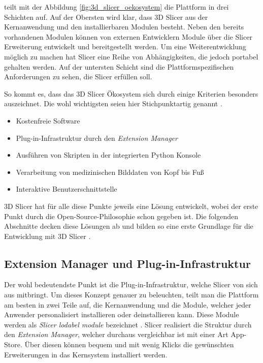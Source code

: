 \citet[S.~23]{fedorov2012slicer} teilt mit der Abbildung \ref{fig:3d_slicer_oekosystem}
die Plattform in drei Schichten auf. Auf der Obersten wird klar, dass 3D Slicer aus
der Kernanwendung und den installierbaren Modulen besteht. Neben den bereits
vorhandenen Modulen können von externen Entwicklern Module über die Slicer
Erweiterung entwickelt und bereitgestellt werden. Um eine Weiterentwicklung möglich
zu machen hat Slicer eine Reihe von Abhängigkeiten, die jedoch portabel gehalten
werden. Auf der untersten Schicht sind die Plattformspezifischen Anforderungen zu
sehen, die Slicer erfüllen soll.

So kommt es, dass das 3D Slicer Ökosystem sich durch einige Kriterien besonders auszeichnet.
Die wohl wichtigsten seien hier Stichpunktartig genannt \citep[vgl.][S.~11]{fedorov2012slicer}.

\begin{itemize}
	\item Kostenfreie Software

	\item Plug-in-Infrastruktur durch den \textit{Extension Manager}

	\item Ausführen von Skripten in der integrierten Python Konsole

	\item Verarbeitung von medizinischen Bilddaten von Kopf bis Fuß

	\item Interaktive Benutzerschnittstelle
\end{itemize}

3D Slicer hat für alle diese Punkte jeweils eine Lösung entwickelt, wobei der erste
Punkt durch die Open-Source-Philosophie schon gegeben ist. Die folgenden
Abschnitte decken diese Lösungen ab und bilden so eine erste Grundlage für die
Entwicklung mit 3D Slicer \citep[vgl.][S.~11]{fedorov2012slicer}.

\subsection{Extension Manager und Plug-in-Infrastruktur}
Der wohl bedeutendste Punkt ist die Plug-in-Infrastruktur, welche Slicer von
sich aus mitbringt. Um dieses Konzept genauer zu beleuchten, teilt man die
Plattform am besten in zwei Teile auf, die Kernanwendung und die Module, welcher
jeder Anwender personalisiert installieren oder deinstallieren kann. Diese Module
werden als \textit{Slicer lodabel module} bezeichnet \citep[vgl.][S.~25]{fedorov2012slicer}.
Slicer realisiert die Struktur durch den \textit{Extension Manager}, welcher
durchaus vergleichbar ist mit einer Art App-Store. Über diesen können bequem und
mit wenig Klicks die gewünschten Erweiterungen in das Kernsystem installiert werden.

